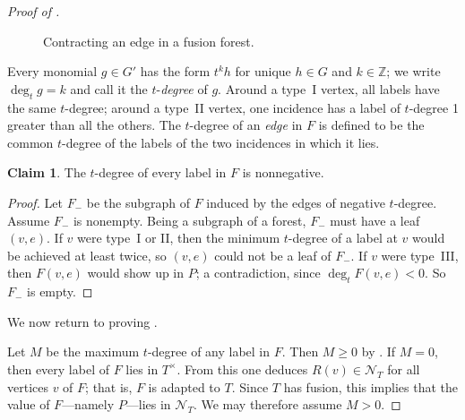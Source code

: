 \documentclass[reqno]{amsart}
\theoremstyle{definition}
\newtheorem{Claim}{Claim}
\theoremstyle{remark}
\newcommand{\Nc}{\mathcal{N}}
\begin{document}
\begin{proof}[Proof of ]
\begin{figure}[ht]
{
    }
    
    \caption{Contracting an edge in a fusion forest.}
    \label{fig:combine}
\end{figure}
Every monomial $g \in G'$ has the form $t^k h$ for unique $h \in G$ and $k \in \mathbb{Z}$; we write $\deg_t g = k$ and call it the $t$-\emph{degree} of $g$.
Around a type~I vertex, all labels  have the same $t$-degree; around a type~II vertex, one incidence has a label of $t$-degree 1 greater than all the others.
The $t$-degree of an \emph{edge} in $F$ is defined to be the common $t$-degree of the labels of the two incidences in which it lies.
\begin{Claim}\label{claim:nonnegative}
    The $t$-degree of every label in $F$ is nonnegative. 
\end{Claim}
\begin{proof}
    Let $F_{-}$ be the subgraph of $F$ induced by the edges of negative $t$-degree. Assume $F_-$ is nonempty. Being a subgraph of a forest, $F_-$ must have a leaf $(v, e)$. If $v$ were type~I or II, then the minimum $t$-degree of a label at $v$ would be achieved at least twice, so $(v, e)$ could not be a leaf of $F_-$. If $v$ were type~III,
    then $F(v,e)$ would show up in $P$; a contradiction, since $\deg_t F(v, e) < 0$.
    So $F_{-}$ is empty.
\end{proof}

We now return to proving .

Let $M$ be the maximum $t$-degree of any label in $F$. Then $M \geq 0$ by . If $M = 0$, then every label of $F$ lies in $T^{\times}$. From this one deduces $R(v) \in \Nc_T$ for all vertices $v$ of $F$; that is, $F$ is adapted to $T$.
Since $T$ has fusion, this implies that the value of $F$---namely $P$---lies in $\Nc_T$. 
We may therefore assume $M > 0$. 


\end{proof}
\end{document}
